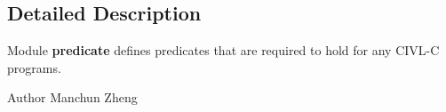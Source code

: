 \subsection{Detailed Description}
Module {\bfseries predicate} defines predicates that are required to hold for any C\+I\+V\+L-\/\+C programs. 

\begin{DoxyAuthor}{Author}
Manchun Zheng 
\end{DoxyAuthor}
